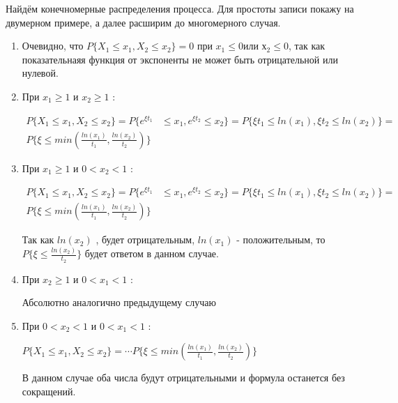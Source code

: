 \documentclass[a4paper,12pt]{article}
\begin{document}
Найдём конечномерные распределения процесса. Для простоты записи покажу на двумерном примере, а далее расширим до многомерного случая.

\begin{enumerate}[\Sun]
	\item Очевидно, что $ P\{X_1 \le x_1, X_2 \le x_2\} = 0 $ при $ x_1 \le 0 $или $х_2 \le 0 $, так как показательнаяя функция от экспоненты не может быть отрицательной или нулевой.
	
	\item При $ x_1 \ge 1 \text{ и } x_2 \ge 1 $ :
	
	\begin{equation}
	\begin{aligned}
	P\{X_1 \le x_1, X_2 \le x_2\}=  P\{e^{\xi t_1}& \le x_1, e^{\xi t_2} \le x_2\} = P\{\xi t_1 \le ln(x_1), \xi t_2 \le ln(x_2)\} =\\ P\{ \xi \le min\left(\frac{ln(x_1)}{t_1}, \frac{ln(x_2)}{t_2}\right) \} 
	\end{aligned}
	\end{equation}
	
	\item При $ x_1 \ge 1 \text{ и } 0 < x_2 < 1 $ :
	
	\begin{equation}
	\begin{aligned}
	P\{X_1 \le x_1, X_2 \le x_2\}=  P\{e^{\xi t_1}& \le x_1, e^{\xi t_2} \le x_2\} = P\{\xi t_1 \le ln(x_1), \xi t_2 \le ln(x_2)\} = \\  P\{ \xi \le min\left(\frac{ln(x_1)}{t_1}, \frac{ln(x_2)}{t_2}\right) \} 
	\end{aligned}
	\end{equation}
	
	Так как $ ln(x_2) $ , будет отрицательным, $ ln(x_1) $ - положительным, то $  P\{ \xi \le \frac{ln(x_2)}{t_2} \} $ будет ответом в данном случае. 
	
	\item При $ x_2 \ge 1 \text{ и } 0 < x_1 < 1 $ :
	
	Абсолютно аналогично предыдущему случаю
	
	\item При $ 0 < x_2 < 1 \text{ и } 0 < x_1 < 1 $ :
	
	$  P\{X_1 \le x_1, X_2 \le x_2\}= \cdots  P\{ \xi \le min\left(\frac{ln(x_1)}{t_1}, \frac{ln(x_2)}{t_2}\right) \}  $
	
	В данном случае оба числа будут отрицательными и формула останется без сокращений.
	

\end{enumerate}
\end{document}
